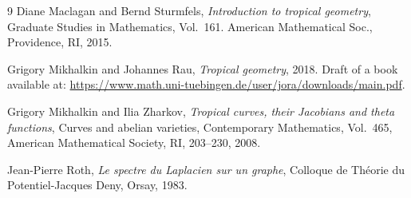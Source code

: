 \documentclass[a4paper,12pt]{amsart}
\begin{document}
\begin{thebibliography}{9}
 Diane Maclagan and Bernd Sturmfels, \textit{Introduction to tropical geometry}, Graduate Studies in Mathematics, Vol.~161. American Mathematical Soc., Providence, RI, 2015.

 Grigory Mikhalkin and Johannes Rau, \textit{Tropical geometry}, 2018. Draft of a book available at: \url{https://www.math.uni-tuebingen.de/user/jora/downloads/main.pdf}.

 Grigory Mikhalkin and Ilia Zharkov, \textit{Tropical curves, their Jacobians and theta functions}, Curves and abelian varieties, Contemporary Mathematics, Vol.~465, American Mathematical Society, RI, 203--230, 2008.

 Jean-Pierre Roth, \textit{Le spectre du Laplacien sur un graphe}, Colloque de Th\'{e}orie du Potentiel-Jacques Deny, Orsay, 1983.
\end{thebibliography}
\end{document}
